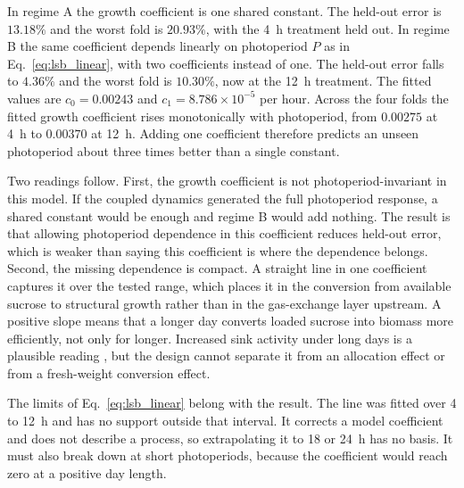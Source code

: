 In regime A the growth coefficient is one shared constant. The held-out error is
$13.18\%$ and the worst fold is $20.93\%$, with the 4~h treatment held out. In
regime B the same coefficient depends linearly on photoperiod $P$ as in
Eq.~\eqref{eq:lsb_linear}, with two coefficients instead of one. The held-out error falls to $4.36\%$ and
the worst fold is $10.30\%$, now at the 12~h treatment. The fitted values are
$c_0 = 0.00243$ and $c_1 = 8.786\times10^{-5}$ per hour. Across the four folds
the fitted growth coefficient rises monotonically with photoperiod, from
$0.00275$ at 4~h to $0.00370$ at 12~h. Adding one coefficient therefore
predicts an unseen photoperiod about three times better than a single
constant.

Two readings follow. First, the growth coefficient is not photoperiod-invariant
in this model. If the coupled dynamics generated the full photoperiod response,
a shared constant would be enough and regime B would add nothing. The result is
that allowing photoperiod dependence in this coefficient reduces held-out error,
which is weaker than saying this coefficient is where the dependence belongs. Second, the
missing dependence is compact. A straight line in one coefficient captures it
over the tested range, which places it in the conversion from available sucrose
to structural growth rather than in the gas-exchange layer upstream. A positive
slope means that a longer day converts loaded sucrose into biomass more
efficiently, not only for longer. Increased sink activity under long days is a
plausible reading \citep{Smith2007,Sulpice2014}, but the design cannot separate
it from an allocation effect or from a fresh-weight conversion effect.

The limits of Eq.~\ref{eq:lsb_linear} belong with the result. The line was
fitted over 4 to 12~h and has no support outside that interval. It corrects a
model coefficient and does not describe a process, so extrapolating it to 18 or
24~h has no basis. It must also break down at short photoperiods, because the
coefficient would reach zero at a positive day length.

